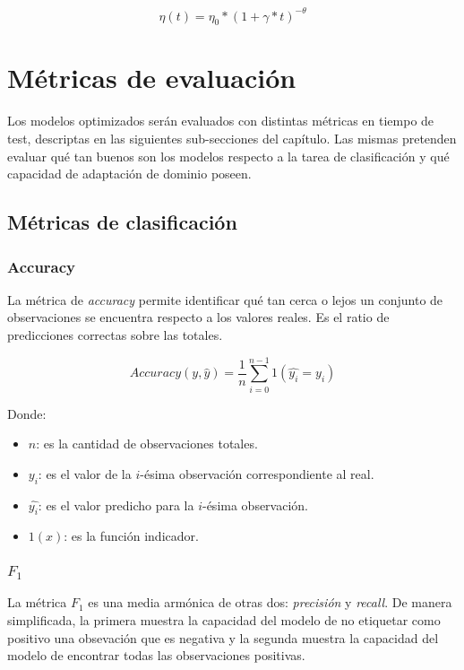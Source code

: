 \begin{equation}
    \eta(t) = \eta_0 * (1 + \gamma * t)^{-\theta}
    \label{eq:learning-rate}
\end{equation}

\section{Métricas de evaluación}

Los modelos optimizados serán evaluados con distintas métricas en tiempo de test, descriptas en las siguientes
sub-secciones del capítulo. Las mismas pretenden evaluar qué tan buenos son los modelos respecto a la tarea de
clasificación y qué capacidad de adaptación de dominio poseen.

\subsection{Métricas de clasificación}
\subsubsection{Accuracy}

La métrica de {\it accuracy} permite identificar qué tan cerca o lejos un conjunto de observaciones se encuentra
respecto a los valores reales. Es el ratio de predicciones correctas sobre las totales.

\begin{equation}
    Accuracy(y, \hat{y}) = \frac{1}{n} \sum_{i=0}^{n-1} 1(\hat{y_{i}}=y_{i})
\end{equation}

Donde:
\begin{itemize}
    \item $n$: es la cantidad de observaciones totales.
    \item $y_{i}$: es el valor de la ${i}$-ésima observación correspondiente al real.
    \item $\hat{y_{i}}$: es el valor predicho para la ${i}$-ésima observación.
    \item $1(x)$: es la función indicador.
\end{itemize}

\subsubsection{$F_{1}$}

La métrica $F_{1}$ es una media armónica de otras dos: {\it precisión} y {\it recall}. De manera simplificada, la
primera muestra la capacidad del modelo de no etiquetar como positivo una obsevación que es negativa y la segunda
muestra la capacidad del modelo de encontrar todas las observaciones positivas.

